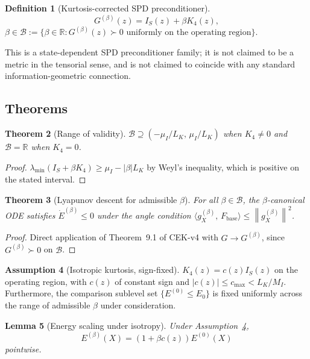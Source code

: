 \documentclass[11pt,a4paper]{article}
\newtheorem{theorem}{Theorem}[section]
\newtheorem{lemma}[theorem]{Lemma}
\theoremstyle{definition}
\newtheorem{definition}[theorem]{Definition}
\newtheorem{assumption}[theorem]{Assumption}
\newcommand{\Fbase}{F_{\mathrm{base}}}
\newcommand{\R}{\mathbb{R}}
\newcommand{\norm}[1]{\left\|#1\right\|}
\newcommand{\inner}[2]{\langle #1,\,#2\rangle}
\begin{document}
\begin{definition}[Kurtosis-corrected SPD preconditioner]
\[
G^{(\beta)}(z) = I_S(z) + \beta K_4(z),
\]
$\beta \in \mathcal{B} := \{\beta \in \R : G^{(\beta)}(z) \succ 0 \text{ uniformly on the operating region}\}$.
\end{definition}

This is a state-dependent SPD preconditioner family; it is not claimed to be a metric in the tensorial sense, and is not claimed to coincide with any standard information-geometric connection.

\subsection{Theorems}

\begin{theorem}[Range of validity]
\label{thm:ac1}
$\mathcal{B} \supseteq (-\mu_I/L_K,\, \mu_I/L_K)$ when $K_4 \neq 0$ and $\mathcal{B} = \R$ when $K_4 = 0$.
\end{theorem}

\begin{proof}
$\lambda_{\min}(I_S + \beta K_4) \geq \mu_I - |\beta| L_K$ by Weyl's inequality, which is positive on the stated interval.
\end{proof}

\begin{theorem}[Lyapunov descent for admissible $\beta$]
\label{thm:ac2}
For all $\beta \in \mathcal{B}$, the $\beta$-canonical ODE satisfies $\dot E^{(\beta)} \leq 0$ under the angle condition $\inner{g_X^{(\beta)}}{\Fbase} \leq \norm{g_X^{(\beta)}}^2$.
\end{theorem}

\begin{proof}
Direct application of Theorem~9.1 of CEK-v4 with $G \to G^{(\beta)}$, since $G^{(\beta)} \succ 0$ on $\mathcal{B}$.
\end{proof}

\begin{assumption}[Isotropic kurtosis, sign-fixed]
\label{ass:iso}
$K_4(z) = c(z) I_S(z)$ on the operating region, with $c(z)$ of constant sign and $|c(z)| \leq c_{\max} < L_K / M_I$. Furthermore, the comparison sublevel set $\{E^{(0)} \leq E_0\}$ is fixed uniformly across the range of admissible $\beta$ under consideration.
\end{assumption}

\begin{lemma}[Energy scaling under isotropy]
\label{lem:isoscale}
Under Assumption~\ref{ass:iso},
\[
E^{(\beta)}(X) = (1 + \beta c(z)) E^{(0)}(X)
\]
pointwise.
\end{lemma}
\end{document}
